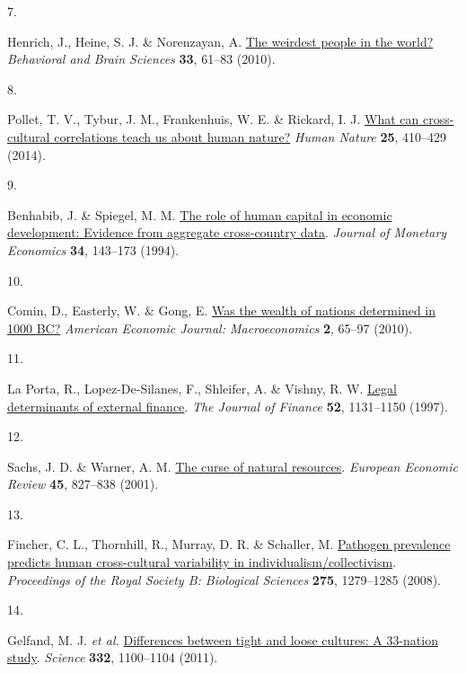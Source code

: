 \documentclass[
  man,floatsintext]{apa6}
\newlength{\cslhangindent}
\newlength{\csllabelwidth}
\newlength{\cslentryspacingunit} %
\newenvironment{CSLReferences}[2] %
 {%
  \setlength{\parindent}{0pt}
  \ifodd #1
  \let\oldpar\par
  \def\par{\hangindent=\cslhangindent\oldpar}
  \fi
  \setlength{\parskip}{#2\cslentryspacingunit}
 }%
 {}
\newcommand{\CSLLeftMargin}[1]{\parbox[t]{\csllabelwidth}{#1}}
\newcommand{\CSLRightInline}[1]{\parbox[t]{\linewidth - \csllabelwidth}{#1}\break}
\begin{document}
\begin{CSLReferences}{0}{0}
\leavevmode{}%
\CSLLeftMargin{7. }%
\CSLRightInline{Henrich, J., Heine, S. J. \& Norenzayan, A. \href{https://doi.org/10.1017/S0140525X0999152X}{The weirdest people in the world?} \emph{Behavioral and Brain Sciences} \textbf{33}, 61--83 (2010).}

\leavevmode{}%
\CSLLeftMargin{8. }%
\CSLRightInline{Pollet, T. V., Tybur, J. M., Frankenhuis, W. E. \& Rickard, I. J. \href{https://doi.org/10.1007/s12110-014-9206-3}{What can cross-cultural correlations teach us about human nature?} \emph{Human Nature} \textbf{25}, 410--429 (2014).}

\leavevmode{}%
\CSLLeftMargin{9. }%
\CSLRightInline{Benhabib, J. \& Spiegel, M. M. \href{https://doi.org/10.1016/0304-3932(94)90047-7}{The role of human capital in economic development: Evidence from aggregate cross-country data}. \emph{Journal of Monetary Economics} \textbf{34}, 143--173 (1994).}

\leavevmode{}%
\CSLLeftMargin{10. }%
\CSLRightInline{Comin, D., Easterly, W. \& Gong, E. \href{http://www.jstor.org/stable/25760309}{Was the wealth of nations determined in 1000 {BC}?} \emph{American Economic Journal: Macroeconomics} \textbf{2}, 65--97 (2010).}

\leavevmode{}%
\CSLLeftMargin{11. }%
\CSLRightInline{La Porta, R., Lopez-De-Silanes, F., Shleifer, A. \& Vishny, R. W. \href{https://doi.org/10.1111/j.1540-6261.1997.tb02727.x}{Legal determinants of external finance}. \emph{The Journal of Finance} \textbf{52}, 1131--1150 (1997).}

\leavevmode{}%
\CSLLeftMargin{12. }%
\CSLRightInline{Sachs, J. D. \& Warner, A. M. \href{https://doi.org/10.1016/S0014-2921(01)00125-8}{The curse of natural resources}. \emph{European Economic Review} \textbf{45}, 827--838 (2001).}

\leavevmode{}%
\CSLLeftMargin{13. }%
\CSLRightInline{Fincher, C. L., Thornhill, R., Murray, D. R. \& Schaller, M. \href{https://doi.org/10.1098/rspb.2008.0094}{Pathogen prevalence predicts human cross-cultural variability in individualism/collectivism}. \emph{Proceedings of the Royal Society B: Biological Sciences} \textbf{275}, 1279--1285 (2008).}

\leavevmode{}%
\CSLLeftMargin{14. }%
\CSLRightInline{Gelfand, M. J. \emph{et al.} \href{https://doi.org/10.1126/science.1197754}{Differences between tight and loose cultures: A 33-nation study}. \emph{Science} \textbf{332}, 1100--1104 (2011).}


\end{CSLReferences}
\end{document}
